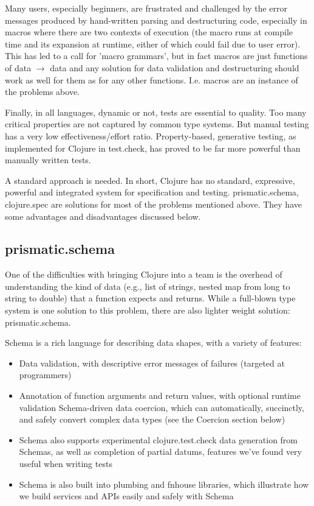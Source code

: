 Many users, especially beginners, are frustrated and challenged by the error
messages produced by hand-written parsing and destructuring code, especially in
macros where there are two contexts of execution (the macro runs at compile time
and its expansion at runtime, either of which could fail due to user error).
This has led to a call for 'macro grammars', but in fact macros are just
functions of data $\rightarrow$ data and any solution for data validation and
destructuring should work as well for them as for any other functions. I.e.
macros are an instance of the problems above.

Finally, in all languages, dynamic or not, tests are essential to quality. Too
many critical properties are not captured by common type systems. But manual
testing has a very low effectiveness/effort ratio. Property-based, generative
testing, as implemented for Clojure in test.check, has proved to be far more
powerful than manually written tests.

A standard approach is needed. In short, Clojure has no standard, expressive,
powerful and integrated system for specification and testing. prismatic.schema,
clojure.spec are solutions for most of the problems mentioned above. They have
some advantages and disadvantages discussed below.

\subsection{prismatic.schema}

One of the difficulties with bringing Clojure into a team is the overhead of
understanding the kind of data (e.g., list of strings, nested map from long to
string to double) that a function expects and returns. While a full-blown type
system is one solution to this problem, there are also lighter weight solution:
prismatic.schema.

Schema is a rich language for describing data shapes, with a variety of features:
\begin{itemize}
\item Data validation, with descriptive error messages of failures (targeted at
  programmers)
\item Annotation of function arguments and return values, with optional runtime
  validation Schema-driven data coercion, which can automatically, succinctly,
  and safely convert complex data types (see the Coercion section below)
\item Schema also supports experimental clojure.test.check data generation from
  Schemas, as well as completion of partial datums, features we've found very
  useful when writing tests
\item Schema is also built into plumbing and fnhouse libraries, which illustrate
  how we build services and APIs easily and safely with Schema
\end{itemize}


